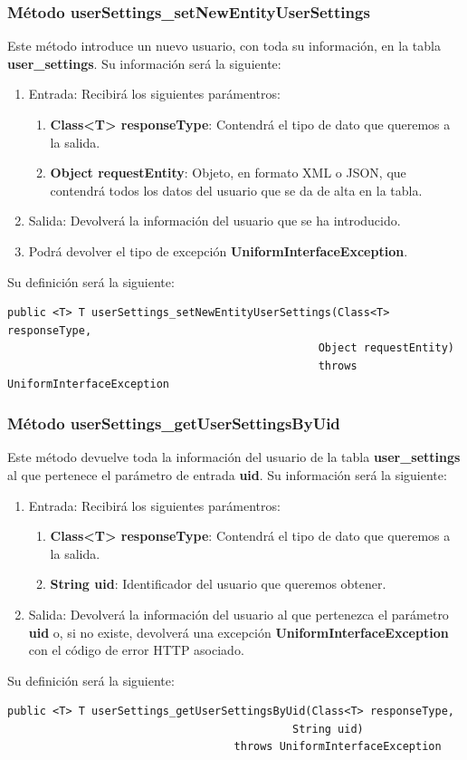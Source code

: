 \subsubsection{Método userSettings\_setNewEntityUserSettings}
Este método introduce un nuevo usuario, con toda su información, en la tabla \textbf{user\_settings}. Su información será la siguiente:
\begin{enumerate}
\item Entrada: Recibirá los siguientes parámentros:
\begin{enumerate}
\item \textbf{Class<T> responseType}: Contendrá el tipo de dato que queremos a la salida. 
\item \textbf{Object requestEntity}: Objeto, en formato XML o JSON, que contendrá todos los datos del usuario que se da de alta en la tabla.
\end{enumerate}
\item Salida: Devolverá la información del usuario que se ha introducido.
\item Podrá devolver el tipo de excepción \textbf{UniformInterfaceException}.
\end{enumerate}
\bigskip
\par
Su definición será la siguiente:
\begin{verbatim}public <T> T userSettings_setNewEntityUserSettings(Class<T> responseType, 
                                                Object requestEntity) 
                                                throws UniformInterfaceException \end{verbatim}

\subsubsection{Método userSettings\_getUserSettingsByUid}
Este método devuelve toda la información del usuario de la tabla \textbf{user\_settings} al que pertenece el parámetro de entrada \textbf{uid}. Su información será la siguiente:
\begin{enumerate}
\item Entrada: Recibirá los siguientes parámentros:
\begin{enumerate}
\item \textbf{Class<T> responseType}: Contendrá el tipo de dato que queremos a la salida. 
\item \textbf{String uid}: Identificador del usuario que queremos obtener.
\end{enumerate}
\item Salida: Devolverá la información del usuario al que pertenezca el parámetro \textbf{uid} o, si no existe, devolverá una excepción \textbf{UniformInterfaceException} con el código de error HTTP asociado.
\end{enumerate}
\bigskip
\par
Su definición será la siguiente:
\begin{verbatim}public <T> T userSettings_getUserSettingsByUid(Class<T> responseType, 
                          		            String uid) 
                           		   throws UniformInterfaceException \end{verbatim}

